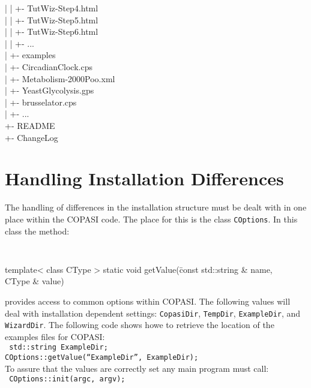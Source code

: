 \documentclass[12pt]{book}
\begin{document}
{\begin{tabbing}
 \> | \> \> | \> \> +- TutWiz-Step4.html \\
 \> | \> \> | \> \> +- TutWiz-Step5.html \\
 \> | \> \> | \> \> +- TutWiz-Step6.html \\
 \> | \> \> | \> \> +- ... \\
 \> | \> \> +- examples \\
 \> | \> \> \> +- CircadianClock.cps \\
 \> | \> \> \> +- Metabolism-2000Poo.xml \\
 \> | \> \> \> +- YeastGlycolysis.gps \\
 \> | \> \> \> +- brusselator.cps \\
 \> | \> \> \> +- ... \\
 \> +- README \\
 \> +- ChangeLog \\
\end{tabbing}
}

\section{Handling Installation Differences}
The handling of differences in the installation structure must be
dealt with in one place within the COPASI code. The place for this is
the class {\tt COptions}. In this class the method:
{\tt \scriptsize
\begin{tabbing}
template< class CType > static void getValue(\=const std::string \&
name, \\
\> CType \& value)
\end{tabbing}
}
\noindent
provides access to common options within COPASI. The following values
will deal with installation dependent settings:
{\tt CopasiDir}, {\tt TempDir}, {\tt ExampleDir}, and {\tt WizardDir}. The following code
shows howe to retrieve the location of the examples files for COPASI: \\
{\tt \scriptsize
\indent std::string ExampleDir; \\[-4 pt]
\indent COptions::getValue(``ExampleDir'', ExampleDir); \\
}
\noindent
To assure that the values are correctly set any main program must
call: \\
{\tt \scriptsize
\indent       COptions::init(argc, argv);
}
\end{document}
